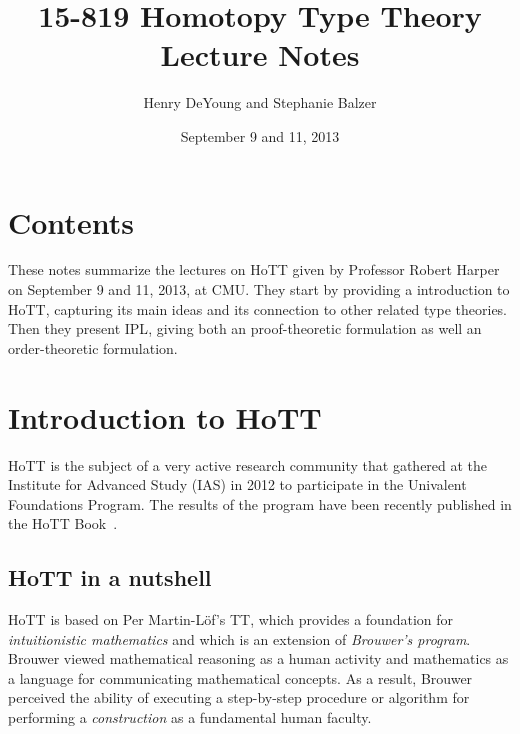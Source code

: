 \documentclass[12pt]{article}
\begin{document}
\title{15-819 Homotopy Type Theory\\ Lecture Notes}
\author{Henry DeYoung and Stephanie Balzer}
\date{September 9 and 11, 2013}

\maketitle




\section{Contents}\label{sec:contents}

These notes summarize the lectures on \ac{HoTT} given by Professor Robert Harper on September 9
and 11, 2013, at CMU.  They start by providing a introduction to \ac{HoTT}, capturing its main
ideas and its connection to other related type theories.  Then they present \ac{IPL}, giving
both an proof-theoretic formulation as well an order-theoretic formulation.


\section{Introduction to \acl{HoTT}}\label{sec:intro}

\Acf{HoTT} is the subject of a very active research community that gathered at the Institute
for Advanced Study (IAS) in 2012 to participate in the Univalent Foundations Program.  The
results of the program have been recently published in the \ac{HoTT} Book~\cite{HoTTBook2013}.

\subsection{\Acs{HoTT} in a nutshell}\label{subsec:hott_in_nutshell}

\Ac{HoTT} is based on Per Martin-L\"{o}f's \acl{TT}, which provides a foundation for
\emph{intuitionistic mathematics} and which is an extension of \emph{Brouwer's program}.
Brouwer viewed mathematical reasoning as a human activity and mathematics as a language for
communicating mathematical concepts.  As a result, Brouwer perceived the ability of executing a
step-by-step procedure or algorithm for performing a \emph{construction} as a fundamental human
faculty.
\end{document}
